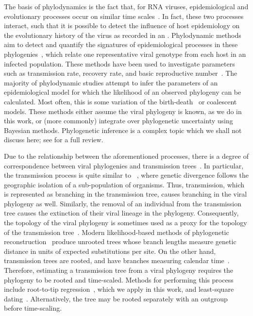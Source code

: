 The basis of phylodynamics is the fact that, for RNA viruses, epidemiological
and evolutionary processes occur on similar time
scales~\autocite{drummond2003measurably}. In fact, these two processes
interact, such that it is possible to detect the influence of host epidemiology
on the evolutionary history of the virus as recorded in an . Phylodynamic methods aim to detect and quantify the
signatures of epidemiological processes in these
phylogenies~\autocite{pybus2009evolutionary, volz2013viral}, which relate one
representative viral genotype from each host in an infected population. These
methods have been used to investigate parameters such as transmission rate,
recovery rate, and basic reproductive number~\autocite{pybus2009evolutionary,
volz2013viral}. The majority of phylodynamic studies attempt to infer the
parameters of an epidemiological model for which the likelihood of an observed
phylogeny can be calculated. Most often, this is some variation of the
birth-death~\autocite{kendall1948generalized, stadler2012estimating} or
coalescent~\autocite{kingman1982coalescent, volz2012complex} models. These
methods either assume the viral phylogeny is known, as we do in this work, or
(more commonly) integrate over phylogenetic uncertainty using Bayesian methods.
Phylogenetic inference is a complex topic which we shall not discuss here; see
\eg \autocite{nei2000molecular} for a full review.

Due to the relationship between the aforementioned processes, there is a degree
of correspondence between viral phylogenies and transmission
trees~\autocite{leitner2002molecular, ypma2013relating, kenah2015algorithms,
kenah2016molecular}. In particular, the transmission process is quite similar
to ~\autocite{coyne2004speciation}, where genetic
divergence follows the geographic isolation of a sub-population of organisms.
Thus, transmission, which is represented as branching in the transmission tree,
causes branching in the viral phylogeny as well. Similarly, the removal of an
individual from the transmission tree causes the extinction of their viral
lineage in the phylogeny. Consequently, the topology of the viral phylogeny is
sometimes used as a proxy for the topology of the transmission
tree~\autocite{hall2015epidemic}. Modern likelihood-based methods of
phylogenetic reconstruction~\autocite[\eg][]{price2010fasttree,
stamatakis2014raxml} produce unrooted trees whose branch lengths measure
genetic distance in units of expected substitutions per site. On the other
hand, transmission trees are rooted, and have branches measuring calendar
time~\autocite{pybus2009evolutionary}. Therefore, estimating a transmission
tree from a viral phylogeny requires the phylogeny to be rooted and
time-scaled. Methods for performing this process include root-to-tip
regression~\autocite{shankarappa1999consistent, korber2000timing,
drummond2003inference}, which we apply in this work, and least-square
dating~\autocite{to2015fast}. Alternatively, the tree may be rooted separately
with an outgroup~\autocite{li1988rates} before time-scaling.

